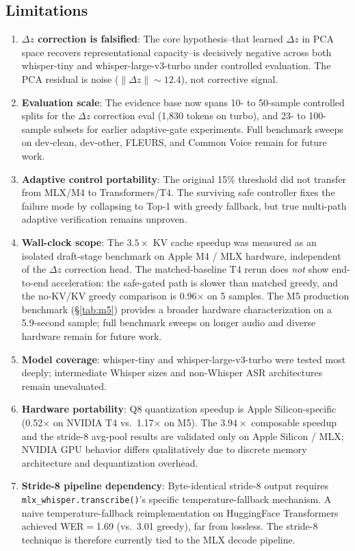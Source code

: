 \documentclass[11pt,a4paper]{article}
\begin{document}
\subsection{Limitations}
\begin{enumerate}[leftmargin=*,itemsep=2pt]
    \item \textbf{$\Delta z$ correction is falsified}: The core hypothesis--that learned $\Delta z$ in PCA space recovers representational capacity--is decisively negative across both whisper-tiny and whisper-large-v3-turbo under controlled evaluation. The PCA residual is noise ($\|\Delta z\| \sim 12.4$), not corrective signal.
    \item \textbf{Evaluation scale}: The evidence base now spans 10- to 50-sample controlled splits for the $\Delta z$ correction eval (1,830 tokens on turbo), and 23- to 100-sample subsets for earlier adaptive-gate experiments. Full benchmark sweeps on dev-clean, dev-other, FLEURS, and Common Voice remain for future work.
    \item \textbf{Adaptive control portability}: The original 15\% threshold did not transfer from MLX/M4 to Transformers/T4.
    The surviving safe controller fixes the failure mode by collapsing to Top-1 with greedy fallback, but true multi-path adaptive verification remains unproven.
    \item \textbf{Wall-clock scope}: The $3.5\times$ KV cache speedup was measured as an isolated draft-stage benchmark on Apple M4 / MLX hardware, independent of the $\Delta z$ correction head. The matched-baseline T4 rerun does \emph{not} show end-to-end acceleration: the safe-gated path is slower than matched greedy, and the no-KV/KV greedy comparison is 0.96$\times$ on 5 samples. The M5 production benchmark (\S\ref{tab:m5}) provides a broader hardware characterization on a 5.9-second sample; full benchmark sweeps on longer audio and diverse hardware remain for future work.
    \item \textbf{Model coverage}: whisper-tiny and whisper-large-v3-turbo were tested most deeply; intermediate Whisper sizes and non-Whisper ASR architectures remain unevaluated.
    \item \textbf{Hardware portability}: Q8 quantization speedup is Apple Silicon-specific (0.52$\times$ on NVIDIA T4 vs.\ 1.17$\times$ on M5). The $3.94\times$ composable speedup and the stride-8 avg-pool results are validated only on Apple Silicon / MLX; NVIDIA GPU behavior differs qualitatively due to discrete memory architecture and dequantization overhead.
    \item \textbf{Stride-8 pipeline dependency}: Byte-identical stride-8 output requires \texttt{mlx\_whisper.transcribe()}'s specific temperature-fallback mechanism. A naive temperature-fallback reimplementation on HuggingFace Transformers achieved WER$=$1.69 (vs.\ 3.01 greedy), far from lossless. The stride-8 technique is therefore currently tied to the MLX decode pipeline.
\end{enumerate}
\end{document}
